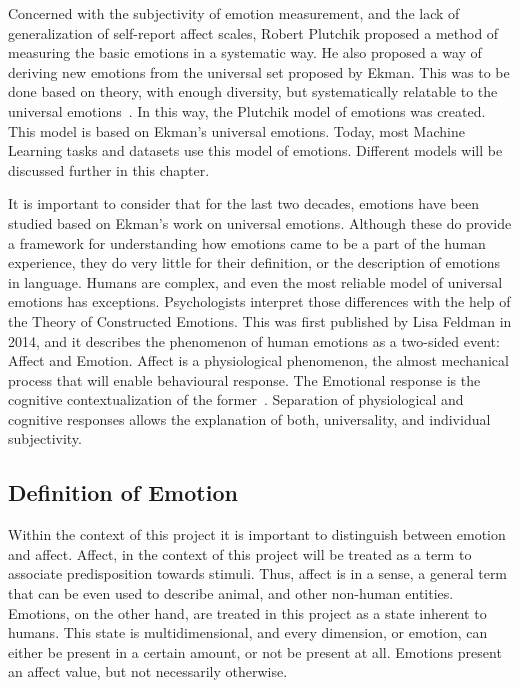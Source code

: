 Concerned with the subjectivity of emotion measurement, and the lack of generalization of self-report affect scales, Robert Plutchik proposed a method of measuring the basic emotions in a systematic way. He also proposed a way of deriving new emotions from the universal set proposed by Ekman. This was to be done based on theory, with enough diversity, but systematically relatable to the universal emotions~\cite{plutchik2013measurement}. In this way, the Plutchik model of emotions was created. This model is based on Ekman's universal emotions. Today, most Machine Learning tasks and datasets use this model of emotions. Different models will be discussed further in this chapter.

It is important to consider that for the last two decades, emotions have been studied based on Ekman's work on universal emotions. Although these do provide a framework for understanding how emotions came to be a part of the human experience, they do very little for their definition, or the description of emotions in language. Humans are complex, and even the most reliable model of universal emotions has exceptions. Psychologists interpret those differences with the help of the Theory of Constructed Emotions. This was first published by Lisa Feldman in 2014, and it describes the phenomenon of human emotions as a two-sided event: Affect and Emotion. Affect is a physiological phenomenon, the almost mechanical process that will enable behavioural response. The Emotional response is the cognitive contextualization of the former~\cite{feldman2014constructed}. Separation of physiological and cognitive responses allows the explanation of both, universality, and individual subjectivity.


\subsection{Definition of Emotion}\label{sub:Definition of Emotion}
Within the context of this project it is important to distinguish between emotion and affect. Affect, in the context of this project will be treated as a term to associate predisposition towards stimuli. Thus, affect is in a sense, a general term that can be even used to describe animal, and other non-human entities. Emotions, on the other hand, are treated in this project as a state inherent to humans. This state is multidimensional, and every dimension, or emotion, can either be present in a certain amount, or not be present at all.
Emotions present an affect value, but not necessarily otherwise.



